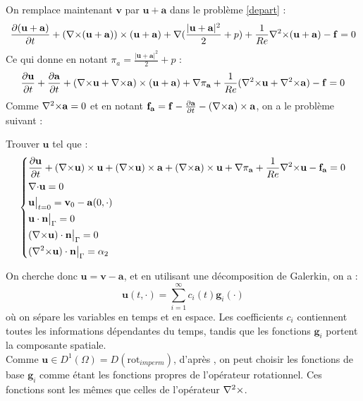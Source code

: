 On remplace maintenant $\mathbf{v}$ par $\mathbf{u}+\mathbf{a}$ dans le problème \ref{depart} :
\[ \frac{\partial(\mathbf{u}+\mathbf{a})}{\partial t}+({\nabla\times}(\mathbf{u}+\mathbf{a}))\times(\mathbf{u}+\mathbf{a}) + {\nabla} (\frac{|\mathbf{u}+\mathbf{a}|^2}{2}+p) + \frac{1}{Re}{\nabla^2\times}(\mathbf{u}+\mathbf{a}) - \mathbf{f} = 0 \]
Ce qui donne en notant $\pi_a=\frac{|\mathbf{u}+\mathbf{a}|^2}{2}+p$ :
\[ \frac{\partial \mathbf{u}}{\partial t}+\frac{\partial \mathbf{a}}{\partial t} + ({\nabla\times} \mathbf{u}+{\nabla\times} \mathbf{a})\times(\mathbf{u}+\mathbf{a}) + {\nabla}\pi_{\mathbf{a}} + \frac{1}{Re}({\nabla^2\times} \mathbf{u}+{\nabla^2\times} \mathbf{a}) - \mathbf{f} = 0 \]
Comme ${\nabla^2\times} \mathbf{a} = 0$ et en notant $\mathbf{f_a}=\mathbf{f}-\frac{\partial \mathbf{a}}{\partial t} - ({\nabla\times} \mathbf{a})\times \mathbf{a}$, on a le problème suivant :
\begin{pb}\label{pbu}
Trouver $\mathbf{u}$ tel que :
\begin{equation*}
\left\{\begin{aligned}
&\frac{\partial \mathbf{u}}{\partial t} + ({\nabla\times} \mathbf{u})\times \mathbf{u} + ({\nabla\times} \mathbf{u})\times \mathbf{a} +({\nabla\times} \mathbf{a})\times \mathbf{u} + {\nabla} \pi_{\mathbf{a}} +\frac{1}{Re}{\nabla^2\times}  \mathbf{u} - \mathbf{f_a} = 0\\
&{\nabla\cdot} \mathbf{u} = 0\\
&\mathbf{u}\big\rvert_{t=0} = \mathbf{v}_0 - \mathbf{a}(0,\cdot)\\
&\mathbf{u}\cdot \mathbf{n}{\big\rvert_{\Gamma}} = 0\\
&({\nabla\times} \mathbf{u})\cdot \mathbf{n}{\big\rvert_{\Gamma}} = 0\\
&({\nabla^2\times}  \mathbf{u})\cdot \mathbf{n}{\big\rvert_{\Gamma}} = \alpha_2
\end{aligned}\right.
\end{equation*}\end{pb}

On cherche donc $\mathbf{u}=\mathbf{v}-\mathbf{a}$, et en utilisant une décomposition de Galerkin, on a :
\begin{equation}\label{u}
\mathbf{u}(t,\cdot) = \sum_{i=1}^{\infty} c_i(t)\mathbf{g}_i(\cdot)
\end{equation}
où on sépare les variables en temps et en espace. Les coefficients $c_i$ contiennent toutes les informations dépendantes du temps, tandis que les fonctions $\mathbf{g}_i$ portent la composante spatiale.\\

Comme $\mathbf{u}\in D^1(\Omega)=D(\mathrm{rot}_{imperm})$, d'après \cite{Penel2004}, on peut choisir les fonctions de base
$\mathbf{g}_i$ comme étant les fonctions propres de l'opérateur rotationnel. Ces
fonctions sont les mêmes que celles de l'opérateur ${\nabla^2\times}$.

